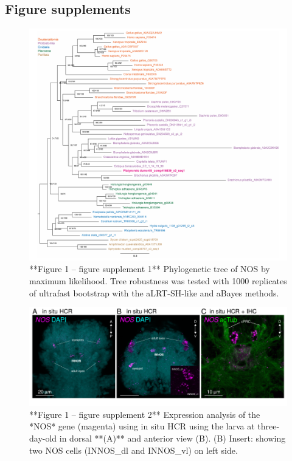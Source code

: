 \documentclass[
  10pt,
  onecolumn]{article}
\begin{document}
\hypertarget{figure-supplements}{%
\subsection{Figure supplements}\label{figure-supplements}}

\begin{figure}
\includegraphics[width=32.64in]{figures/Fig1_sup1} \caption{**Figure 1 -- figure supplement 1**  Phylogenetic tree of NOS by maximum likelihood. Tree robustness was tested with 1000 replicates of ultrafast bootstrap with the aLRT-SH-like and aBayes methods.}\label{fig:unnamed-chunk-8}
\end{figure}

\begin{figure}
\includegraphics[width=16.67in]{figures/Fig1_sup2} \caption{**Figure 1 -- figure supplement 2** Expression analysis of the *NOS* gene (magenta) using in situ HCR using the larva at three-day-old in dorsal **(A)** and anterior view (B). (B) Insert: showing two NOS cells (INNOS_dl and INNOS_vl) on left side.}\label{fig:unnamed-chunk-9}
\end{figure}
\end{document}
